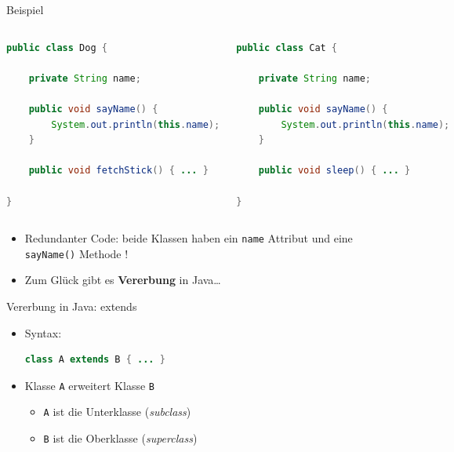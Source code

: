 \documentclass[18pt]{beamer}
\begin{document}
\begin{frame}[fragile]{Beispiel}
    \begin{columns}[c]
            \begin{exampleblock}{}
                \begin{lstlisting}[language=Java,basicstyle=\scriptsize]
public class Dog {

    private String name;

    public void sayName() {
        System.out.println(this.name);
    }

    public void fetchStick() { ... }

}
                \end{lstlisting}

            \end{exampleblock}
            \begin{exampleblock}{}
                \begin{lstlisting}[language=Java,basicstyle=\scriptsize]
public class Cat {

    private String name;

    public void sayName() {
        System.out.println(this.name);
    }

    public void sleep() { ... }

}
                \end{lstlisting}
            \end{exampleblock}
    \end{columns}

    \pause

    \begin{itemize}
        \item Redundanter Code: beide Klassen haben ein \texttt{name} Attribut und eine \texttt{sayName()} Methode !
        \item Zum Glück gibt es \textbf{Vererbung} in Java\dots
    \end{itemize}
\end{frame}

\begin{frame}[fragile]{Vererbung in Java: extends}
    \begin{itemize}
        \item Syntax:\\
\begin{lstlisting}[language=Java]
class A extends B { ... }
\end{lstlisting}
        \item Klasse \texttt{A} erweitert Klasse \texttt{B}
        \begin{itemize}
            \item \texttt{A} ist die Unterklasse (\textit{subclass})
            \item \texttt{B} ist die Oberklasse (\textit{superclass})
        \end{itemize}


    \end{itemize}
\end{frame}
\end{document}
